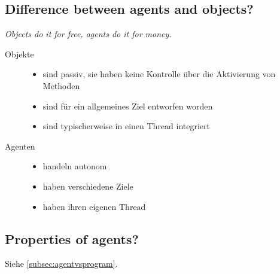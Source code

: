 \subsection{Difference between agents and objects?}
\emph{Objects do it for free, agents do it for money.}
\begin{description}
	\item [Objekte] \begin{itemize}
		\item sind passiv, sie haben keine Kontrolle über die Aktivierung von Methoden
		\item sind für ein allgemeines Ziel entworfen worden
		\item sind typischerweise in einen Thread integriert
	\end{itemize}
	\item [Agenten] \begin{itemize}
		\item handeln autonom
		\item haben verschiedene Ziele
		\item haben ihren eigenen Thread
	\end{itemize}
\end{description}
\subsection{Properties of agents?}
Siehe \ref{subsec:agentvsprogram}.
